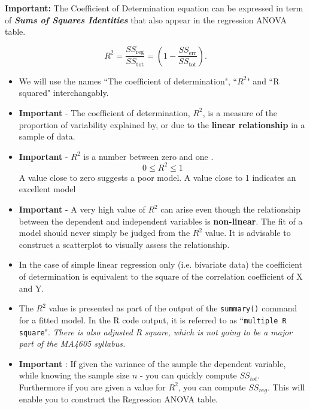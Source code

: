 \documentclass[a4paper,12pt]{article}
\begin{document}
\noindent \textbf{Important:} The Coefficient of Determination equation can be expressed in term of \textbf{\textit{Sums of Squares Identities}} that  also appear in the regression ANOVA table.


\[R^2 = \frac{SS_\textrm{reg}}{SS_\textrm{tot}} =\left( 1- \frac{SS_\textrm{err}}{SS_\textrm{tot}}\right). \]

\newpage
\begin{itemize}
	\item We will use the names ``The coefficient of determination", ``$R^2$" and ``R squared" interchangably.
\item \textbf{Important} - The coefficient of determination, $R^2$, is a measure of the proportion of variability explained by, or due to the \textbf{linear relationship} in a sample of data. 

\item \textbf{Important} - $R^2$ is a number between zero and one .
\[ 0 \leq R^2 \leq 1 \] A value close to zero suggests a poor model. A value close to 1 indicates an excellent model


\item \textbf{Important} - A very high value of $R^2$ can arise even though the relationship between the dependent and independent variables is \textbf{non-linear}. The fit of a model should never simply be judged from the $R^2$ value. It is advisable to construct a scatterplot to visually assess the relationship.

\item In the case of simple linear regression only (i.e. bivariate data) the coefficient of determination is equivalent to the square of the correlation coefficient of X and Y. 

\item The $R^2$ value is presented as part of the output of the \texttt{summary()} command for a fitted model. In the R code output, it is referred to as ``\texttt{multiple R square}". \textit{There is also adjusted R square, which is not going to be a major part of the MA4605 syllabus.}
\item \textbf{Important }: If given the variance of the sample the dependent variable, while knowing the sample size $n$ - you can quickly compute $SS_{tot}$. Furthermore if you are given a value for $R^2$, you can compute $SS_{reg}$. This will enable you to construct the Regression ANOVA table.
\end{itemize}
\end{document}
